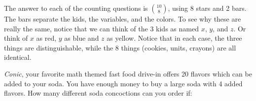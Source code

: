 \begin{questions}



	\begin{answer}
	  The answer to each of the counting questions is ${10 \choose 8}$, using 8 stars and 2 bars.  The bars separate the kids, the variables, and the colors.  To see why these are really the same, notice that we can think of the 3 kids as named $x$, $y$, and $z$.  Or think of $x$ as red, $y$ as blue and $z$ as yellow.  Notice that in each case, the three things are distinguishable, while the 8 things (cookies, units, crayons) are all identical.
	\end{answer}


	

\question \textit{Conic}, your favorite math themed fast food drive-in offers 20 flavors which can be added to your soda.  You have enough money to buy a large soda with 4 added flavors.  How many different soda concoctions can you order if:

  \begin{answer}
\end{answer}
\end{questions}
